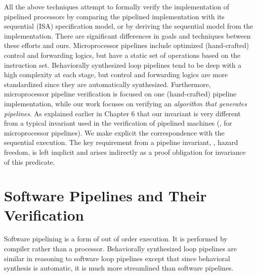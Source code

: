 All the above techniques attempt to formally verify the implementation of
pipelined processors by comparing the pipelined implementation with its sequential
(ISA) specification model, or by deriving the sequential model from
the implementation. There are significant differences in goals
and techniques between these efforts and ours.
Microprocessor pipelines include optimized (hand-crafted)
control and forwarding logics, but have a static set of
operations based on the instruction set. Behaviorally synthesized 
loop pipelines tend to be deep with a high complexity at each stage, but
control and forwarding logics are more standardized since
they are automatically synthesized. 
Furthermore, microprocessor pipeline verification
is focused on one (hand-crafted) pipeline implementation,
while our work focuses on verifying an {\em algorithm
that generates pipelines}. As explained earlier in Chapter 6  that our invariant is very different from a typical invariant
used in the verification of pipelined machines (\eg, for
microprocessor pipelines). We make explicit the
correspondence with the sequential execution. The key
requirement from a pipeline invariant, \viz, hazard freedom,
is left implicit and arises indirectly as a proof obligation
for invariance of this predicate. 
 
\section{Software Pipelines and Their Verification}
Software pipelining is a form of out of order execution. It is performed by compiler rather than a processor. 
Behaviorally synthesized loop pipelines are similar in reasoning to software loop pipelines except that since
behavioral synthesis is automatic, it is much more streamlined than software pipelines. 

